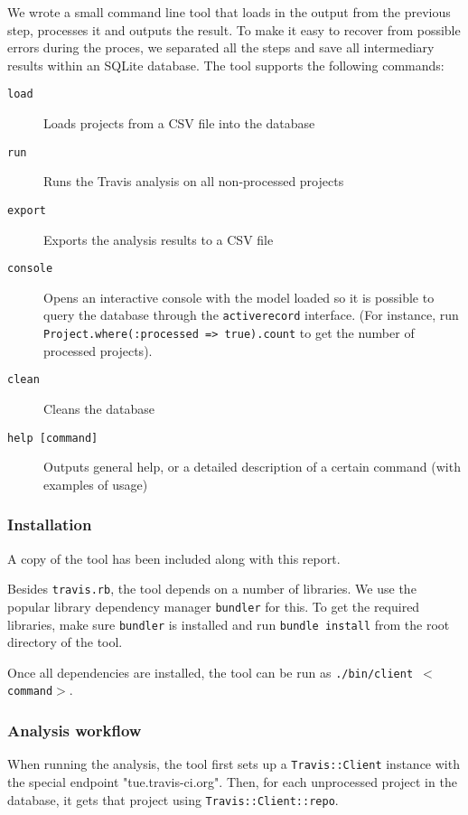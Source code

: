 We wrote a small command line tool that loads in the output from the previous step, processes it and outputs the result.
To make it easy to recover from possible errors during the proces, we separated all the steps and save all intermediary results within an SQLite database.
The tool supports the following commands:

\begin{description}
	\item[\texttt{load}] Loads projects from a CSV file into the database
	\item[\texttt{run}] Runs the Travis analysis on all non-processed projects
	\item[\texttt{export}] Exports the analysis results to a CSV file
	\item[\texttt{console}] Opens an interactive console with the model loaded so it is possible to query the database through the \texttt{activerecord} interface. (For instance, run \texttt{Project.\-where(:processed => true).\-count} to get the number of processed projects).
	\item[\texttt{clean}] Cleans the database
	\item[\texttt{help [command]}] Outputs general help, or a detailed description of a certain command (with examples of usage)
\end{description}

	\subsubsection{Installation}
	A copy of the tool has been included along with this report.
	
	Besides \texttt{travis.rb}, the tool depends on a number of libraries.
	We use the popular library dependency manager \texttt{bundler} for this.
	To get the required libraries, make sure \texttt{bundler} is installed and run \texttt{bundle install} from the root directory of the tool.
	
	Once all dependencies are installed, the tool can be run as \texttt{./bin/client $<$command$>$}.

	\subsubsection{Analysis workflow}
	When running the analysis, the tool first sets up a \texttt{Travis::Client} instance with the special endpoint "tue.travis-ci.org".
	Then, for each unprocessed project in the database, it gets that project using \texttt{Travis::Client::repo}.
	
